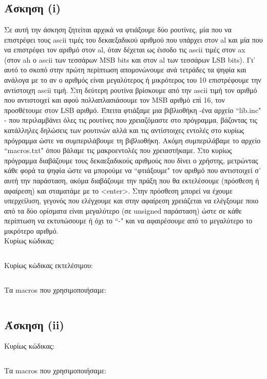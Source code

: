 \documentclass[a4paper,10pt]{article} \usepackage{anysize}
\begin{document}


\section*{} 
\subsection*{Άσκηση (i)}
Σε αυτή την άσκηση ζητείται αρχικά να φτιάξουμε δύο ρουτίνες, μία που να
επιστρέφει τους ascii τιμές του δεκαεξαδικού αριθμού που υπάρχει στον al και
μία που να επιστρέφει τον αριθμό στον al, όταν δέχεται ως έισοδο τις ascii
τιμές στον ax (στον ah ο ascii των τεσσάρων MSB bits και στον al των τεσσάρων
LSB bits). Γι' αυτό το σκοπό στην πρώτη περίπτωση απομονώνουμε ανά τετράδες τα
ψηφία και ανάλογα με το αν ο αριθμός είναι μεγαλύτερος ή μικρότερος του 10
επιστρέφουμε την αντίστοιχη ascii τιμή. Στη δεύτερη ρουτίνα βρίσκουμε από την
ascii τιμή τον αριθμό που αντιστοιχεί και αφού πολλαπλασιάσουμε τον MSB αριθμό
επί 16, τον προσθέτουμε στον LSB αριθμό. Έπειτα φτιάξαμε μια βιβλιοθήκη -ένα
αρχείο ``lib.inc" - που περιλαμβάνει όλες τις ρουτίνες που χρειαζόμαστε στο
πρόγραμμα, βάζοντας τις κατάλληλες δηλώσεις των ρουτινών αλλά και τις
αντίστοιχες εντολές στο κυρίως πρόγραμμα ώστε να συμπεριλάβουμε τη βιβλιοθήκη.
Ακόμη συμπεριλάβαμε το αρχείο ``macros.txt" όπου βάλαμε τις μακροεντολές
που χρειαστήκαμε.  Στο κυρίως πρόγραμμα διαβάζουμε τους δεκαεξαδικούς αριθμούς
που δίνει ο χρήστης, μετρώντας κάθε φορά τα ψηφία ώστε να μπορούμε να
``φτιάξουμε" τον αριθμό που αντιστοιχεί σ' αυτή την παράσταση, ακόμα διαβάζουμε
την πράξη που θα εκτελέσουμε (πρόσθεση ή αφαίρεση) και σταματάμε με το
<enter>. Στην πρόσθεση μπορεί να έχουμε υπερχείλιση, γεγονός που ελέγχουμε και
στην αφαίρεση χρειάζεται να ελέγξουμε ποιο από τα δύο ορίσματα είναι
μεγαλύτερο (σε unsigned παράσταση) ώστε σε κάθε περίπτωση να εκτυπώσουμε ή όχι
το ``-" και να αφαιρέσουμε από το μεγαλύτερο το μικρότερο αριθμό.\\[0.5cm]

\noindent Κυρίως κώδικας:
\inputminted[linenos,obeytabs,fontsize=\footnotesize]{nasm}{files/lib.inc}
\noindent Κυρίως κώδικας εκτελέσιμου:
\inputminted[linenos,obeytabs,fontsize=\footnotesize]{nasm}{files/1.asm}
\noindent Τα macros που χρησιμοποιήσαμε:
\inputminted[linenos,obeytabs,fontsize=\footnotesize]{nasm}{files/1.txt}
\subsection*{Άσκηση (ii)}

\noindent Κυρίως κώδικας:
\inputminted[linenos,obeytabs,fontsize=\footnotesize]{nasm}{files/2.asm}
Τα macros που χρησιμοποιήσαμε:
\inputminted[linenos,obeytabs,fontsize=\footnotesize]{nasm}{files/2.txt}
\end{document}
